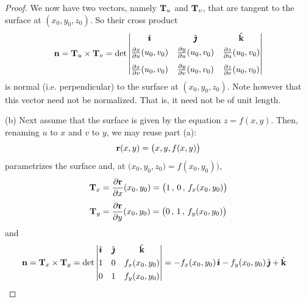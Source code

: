 \begin{proof}
We now have two vectors, namely $\mathbf{T}_u$ and $\mathbf{T}_v$, that are tangent
to the surface at $(x_0,y_0,z_0)$. So their cross product
\begin{align*}
\mathbf{n} = \mathbf{T}_u\times\mathbf{T}_v
=\det\left|\begin{matrix}
            \hat{\pmb{\imath}} &  \hat{\pmb{\jmath}} & \hat{\mathbf{k}} \\[0.05in]
            \frac{\partial x}{\partial u}(u_0,v_0) &
                     \frac{\partial y}{\partial u}(u_0,v_0) &
                     \frac{\partial z}{\partial u}(u_0,v_0) \\[0.1in]
           \frac{\partial x}{\partial v}(u_0,v_0) &
                     \frac{\partial y}{\partial v}(u_0,v_0) &
                     \frac{\partial z}{\partial v}(u_0,v_0)
           \end{matrix}\right|
\end{align*}
is normal (i.e. perpendicular) to the surface at $(x_0,y_0,z_0)$.
Note however that this vector need not be normalized. That is, it need not 
be of unit length.

\bigskip
\noindent (b)
Next assume that the surface is given by the equation
$z=f(x,y)$. Then, renaming $u$ to $x$ and $v$ to $y$, we may reuse part (a):
\begin{equation*}
\mathbf{r}(x,y) = \big(x,y, f(x,y)\big)
\end{equation*}
parametrizes the surface and, at $\big(x_0,y_0,z_0\big)=f(x_0,y_0)\big)$,
\begin{align*}
\mathbf{T}_x &= \frac{\partial\mathbf{r} }{\partial x}(x_0,y_0)
=\big(1\,,\,
      0\,,\,
      f_x(x_0,y_0)\big)
\\[0.05in]
\mathbf{T}_y &= \frac{\partial\mathbf{r} }{\partial y}(x_0,y_0)
=\big(0\,,\,
      1\,,\,
      f_y(x_0,y_0)\big)
\end{align*}
and
\begin{align*}
\mathbf{n} &= \mathbf{T}_x\times\mathbf{T}_y
=\det\left|\begin{matrix}
            \hat{\pmb{\imath}} &  \hat{\pmb{\jmath}} & \hat{\mathbf{k}} \\[0.05in]
            1 & 0 & f_x(x_0,y_0) \\[0.05in]
            0 & 1 & f_y(x_0,y_0)
           \end{matrix}\right|
=-f_x(x_0,y_0)\,\hat{\pmb{\imath}} - f_y(x_0,y_0)\,\hat{\pmb{\jmath}} + \hat{\mathbf{k}}
\end{align*}


\end{proof}
